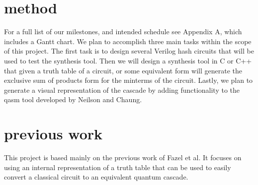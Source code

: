 \documentclass{IEEEtran}
\begin{document}
\section{method}

For a full list of our milestones, and intended schedule see Appendix A, which includes a Gantt chart. We plan to accomplish three main tasks within the scope of this project. The first task is to design several Verilog hash circuits that will be used to test the synthesis tool. Then we will design a synthesis tool in C or C++ that given a truth table of a circuit, or some equivalent form will generate the exclusive sum of products form for the minterms of the circuit. Lastly, we plan to generate a visual representation of the cascade by adding functionality to the qasm tool developed by Neilson and Chaung. \cite{qasm2circ}

\section{previous work}
This project is based mainly on the previous work of Fazel et al. \cite{4313212} It focuses on using an internal representation of a truth table that can be used to easily convert a classical circuit to an equivalent quantum cascade. 

{}




\end{document}
